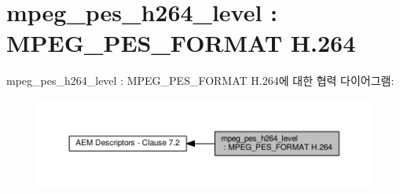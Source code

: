 \hypertarget{group__mpeg__pes__h264__level}{}\section{mpeg\+\_\+pes\+\_\+h264\+\_\+level \+: M\+P\+E\+G\+\_\+\+P\+E\+S\+\_\+\+F\+O\+R\+M\+AT H.264}
\label{group__mpeg__pes__h264__level}
mpeg\+\_\+pes\+\_\+h264\+\_\+level \+: M\+P\+E\+G\+\_\+\+P\+E\+S\+\_\+\+F\+O\+R\+M\+AT H.264에 대한 협력 다이어그램\+:
\nopagebreak
\begin{figure}[H]
\begin{center}
\leavevmode
\includegraphics[width=350pt]{group__mpeg__pes__h264__level}
\end{center}
\end{figure}
